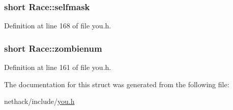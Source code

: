 \hypertarget{structRace_a18016193be7875cc535f72383934d977}{
\subsubsection[{selfmask}]{\setlength{\rightskip}{0pt plus 5cm}short Race\+::selfmask}}\label{structRace_a18016193be7875cc535f72383934d977}


Definition at line 168 of file you.\+h.

\hypertarget{structRace_a1b6fce11cbd5ac450b0f28e1c28e9c82}{
\subsubsection[{zombienum}]{\setlength{\rightskip}{0pt plus 5cm}short Race\+::zombienum}}\label{structRace_a1b6fce11cbd5ac450b0f28e1c28e9c82}


Definition at line 161 of file you.\+h.



The documentation for this struct was generated from the following file\+:\begin{DoxyCompactItemize}
\item 
nethack/include/\hyperlink{you_8h}{you.\+h}\end{DoxyCompactItemize}
